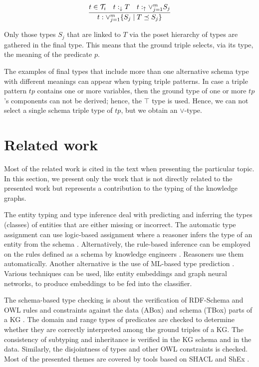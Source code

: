 \documentclass[runningheads]{llncs}
\newcommand{\darr}{\downarrow}
\newcommand{\uarr}{\uparrow}
\newcommand{\T}{{\cal T}}
\begin{document}
\begin{equation}
\label{rul:3-typing-two}
\dfrac{t\in\T_i\quad t:_{\darr}T\quad\/t:_\uarr\lor_{j=1}^{m}\/S_j}
      {t:\lor_{j=1}^m\{S_j \mid T\preceq\/S_j\}}
\end{equation}

Only those types $S_j$ that are linked to $T$ via the poset hierarchy
of types are gathered in the final type. This means that the ground
triple selects, via its type, the meaning of the predicate $p$.

The examples of final types that include more than one alternative
schema type with different meanings can appear when typing triple
patterns. In case a triple pattern $tp$ contains one or more
variables, then the ground type of one or more $tp$'s components can
not be derived; hence, the $\top$ type is used. Hence, we can not
select a single schema triple type of $tp$, but we obtain an
$\lor$-type.






\section{Related work\label{sec:related}}

Most of the related work is cited in the text when presenting the
particular topic. In this section, we present only the work that is not
directly related to the presented work but represents a contribution
to the typing of the knowledge graphs.

The entity typing and type inference deal with predicting and
inferring the types (classes) of entities that are either missing or
incorrect. The automatic type assignment can use logic-based
assignment where a reasoner infers the type of an entity from the
schema \cite{Horrocks2003}. Alternatively, the rule-based inference
can be employed on the rules defined as a schema by knowledge
engineers \cite{Horrocks2004}. Reasoners use them
automatically. Another alternative is the use of ML-based type
prediction \cite{Yaghoobzadeh2018}. Various techniques can be used,
like entity embeddings and graph neural networks, to produce
embeddings to be fed into the classifier.

The schema-based type checking is about the verification of RDF-Schema
\cite{rdfschema12} and OWL \cite{owl2} rules and constraints against
the data (ABox) and schema (TBox) parts of a KG
\cite{Baader2002,Horrocks2003,OWL2Spec2012}. The domain and range
types of predicates are checked to determine whether they are correctly interpreted
among the ground triples of a KG. The consistency of subtyping and
inheritance is verified in the KG schema and in the data. Similarly,
the disjointness of types and other OWL constraints is
checked. Most of the presented themes are covered by tools based on
SHACL \cite{shacl2017} and ShEx \cite{shex2015}.
\end{document}
